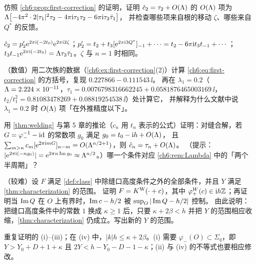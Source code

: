 \begin{exercise}\label{ch6:ex:mode2}
仿照 \cref{ch6:prop:first-correction} 的证明，证明 $\hat c_2=\tau_2+O(\Lambda)$ 的 $O(\Lambda)$ 项为
$\Lambda\bigl[-4\pi^2\cdot2|\tau_1|^2\tau_2-4\pi\mathrm{i}\tau_1\tau_2-6\pi\mathrm{i}\tau_3\bar\tau_1\bigr]$，
并检查哪些项来自根的移动 $\zeta$、哪些来自 $Q^*$ 的反馈。
\end{exercise}
\begin{hint}
$\hat c_2=p'_2\mathrm{e}^{2\pi\mathrm{i} (-2t_0)}\mathrm{e}^{2\pi\mathrm{i} 2\zeta}$；$p'_2=t_2+t_3[\mathrm{e}^{2\pi\mathrm{i} 3Q^*}]_{-1}+\cdots=t_2-6\pi\mathrm{i} t_3t_{-1}+\cdots$；
$t_3t_{-1}\mathrm{e}^{2\pi\mathrm{i} (-2t_0)}=\Lambda\tau_3\bar\tau_1$。$\zeta$ 与 $n=1$ 时相同。
\end{hint}

\begin{exercise}\label{ch6:ex:numeric}
（数值）用二次族的数据（\cref{ch6:ex:first-correction}(2)）计算 \eqref{ch6:eq:first-correction} 的方括号，复现 $0.227866-0.111543\,\ii$。
再在 $\lambda_1=0.2$（$\Lambda=2.224\times10^{-11}$，$\tau_1=0.0076798316662245+0.0581876465003169\,\ii$，$t_2/t_1^2=0.81083478269+0.08819254538\,\ii$）处计算它，
并解释为什么文献中说 $\lambda_1=0.2$ 时 $O(\Lambda)$ 项「在外推精度以下」。
\end{exercise}

\begin{exercise}\label{ch6:ex:welding-identity}
用 \cref{thm:welding} 与第 5 章的推论（$c_n$ 用 $t_n$ 表示的公式）证明：对缝合解，若 $G=\varphi_-^{-1}-\mathrm{id}$ 的常数项 $g_0$ 满足 $g_0=t_0-\mathrm{i} h+O(\Lambda)$，
且 $\sum_{m>n}c_m[\mathrm{e}^{2\pi\mathrm{i} mG}]_{n-m}=O(\Lambda^{n/2+1})$，则 $\hat c_n=\tau_n+O(\Lambda)$。
（提示：$|\mathrm{e}^{2\pi\mathrm{i} (-ng_0)}|=\mathrm{e}^{2\pi n\operatorname{Im} g_0}\approx\Lambda^{n/2}$。）哪一个条件对应 \cref{ch6:rem:Lambda} 中的「两个半周期」？
\end{exercise}

\begin{exercise}\label{ch6:ex:root-necessity}
（较难）设 $F$ 满足 \cref{def:class} 中除缝口高度条件之外的全部条件，并且 $Y$ 满足 \cref{thm:characterization} 的范围。
证明 $F=K^{\mathrm W}(\cdot+c)$，其中 $\varphi^W_+(c)\in\mathrm{i} h\mathbb{Z}$；再证明当 $\operatorname{Im} Q$ 在 $O$ 上有界时，$\operatorname{Im} c-h/2$ 被 $\sup_O|\operatorname{Im} Q-h/2|$ 控制。
由此说明：把缝口高度条件中的常数 $1$ 换成 $\kappa\ge1$ 后，只要 $\kappa+2\beta<h$ 并把 $Y$ 的范围相应收缩，\cref{thm:characterization} 仍成立。写出新的 $Y$ 的范围。
\end{exercise}
\begin{hint}
重复证明的 (i)--(iii)；在 (iv) 中，$|k|h\le\kappa+2\beta$。(i) 需要 $\varphi_-(O)\subset\Sigma_q$，即 $Y>Y_0+D+1+\kappa$ 且 $2Y<h-Y_0-D-1-\kappa$；(ii) 与 (iv) 的不等式也要相应修改。
\end{hint}
